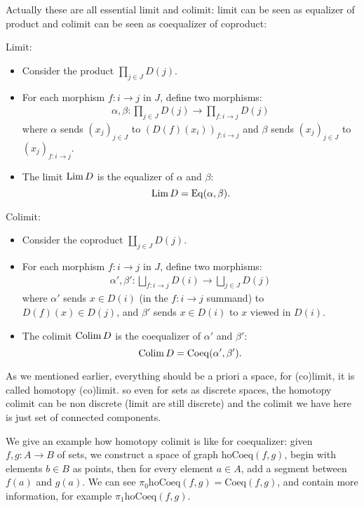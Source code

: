 \begin{remark}
  Actually these are all essential limit and colimit: limit can be seen as equalizer of product and colimit can be seen as coequalizer of coproduct:

  Limit:
\begin{itemize}
    \item Consider the product $\prod_{j \in J} D(j)$.
    \item For each morphism $f : i \to j$ in $J$, define two morphisms:
    \begin{align*}
        \alpha, \beta : \prod_{j \in J} D(j) \to \prod_{f : i \to j} D(j)
    \end{align*}
    where $\alpha$ sends $(x_j)_{j \in J}$ to $(D(f)(x_i))_{f : i \to j}$ and $\beta$ sends $(x_j)_{j \in J}$ to $(x_j)_{f : i \to j}$.
    \item The limit $\operatorname*{\mathrm{Lim}} D$ is the equalizer of $\alpha$ and $\beta$:
    \[
    \operatorname*{\mathrm{Lim}} D = \mathrm{Eq}(\alpha, \beta).
    \]
\end{itemize}
Colimit:
\begin{itemize}
    \item Consider the coproduct $\coprod_{j \in J} D(j)$.
    \item For each morphism $f : i \to j$ in $J$, define two morphisms:
    \begin{align*}
        \alpha', \beta' : \bigsqcup_{f : i \to j} D(i) \to \bigsqcup_{j \in J} D(j)
    \end{align*}
    where $\alpha'$ sends $x \in D(i)$ (in the $f : i \to j$ summand) to $D(f)(x) \in D(j)$, and $\beta'$ sends $x \in D(i)$ to $x$ viewed in $D(i)$.
    \item The colimit $\operatorname*{\mathrm{Colim}} D$ is the coequalizer of $\alpha'$ and $\beta'$:
    \[
    \operatorname*{\mathrm{Colim}} D = \mathrm{Coeq}(\alpha', \beta').
    \]
\end{itemize}
\end{remark}

\begin{remark}
  As we mentioned earlier, everything should be a priori a space, for (co)limit, it is called homotopy (co)limit. so even for sets as discrete spaces, the homotopy colimit can be non discrete (limit are still discrete) and the colimit we have here is just set of connected components.
  
  We give an example how homotopy colimit is like for coequalizer: given $f,g:A\to B$ of sets, we construct a space of graph $\mathrm{hoCoeq}(f,g)$, begin with elements $b \in B $ as points, then for every element $a\in A$, add a segment between $f(a)$ and $g(a)$. We can see $ \pi_0\mathrm{hoCoeq}(f,g)=\mathrm{Coeq}(f,g)$, and contain more information, for example $\pi_1\mathrm{hoCoeq}(f,g)$.
\end{remark}

